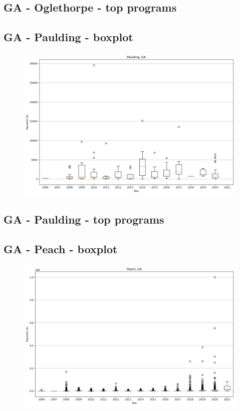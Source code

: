 \subsection*{GA - Oglethorpe - top programs}

\newpage
\subsection*{GA - Paulding - boxplot}
\begin{figure}[h]
\centering
\includegraphics[width=7in]{../output/boxplots/counties/Paulding-GA_boxplot.png}
\end{figure}


\subsection*{GA - Paulding - top programs}

\newpage
\subsection*{GA - Peach - boxplot}
\begin{figure}[h]
\centering
\includegraphics[width=7in]{../output/boxplots/counties/Peach-GA_boxplot.png}
\end{figure}


